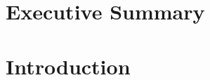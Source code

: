 \documentclass{a4wolke}
\begin{document}
\maketitle
\section*{Executive Summary}
\clearpage
\tableofcontents
\section{Introduction}
\end{document}
